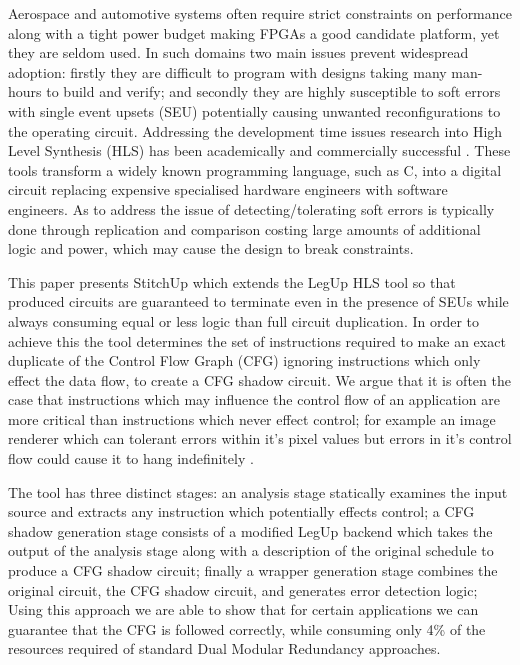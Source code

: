 
Aerospace and automotive systems often require strict constraints on performance
along with a tight power budget making FPGAs a good candidate platform, yet they are seldom used.
In such domains two main issues prevent widespread adoption: firstly they are difficult
to program with designs taking many man-hours to build and verify;
and secondly they are highly susceptible to soft errors with single event upsets (SEU)
potentially causing unwanted reconfigurations to the operating circuit.
Addressing the development time issues research into High Level Synthesis (HLS) has been academically and
commercially successful \cite{feist2012vivado}. These tools transform a widely known programming language, such as C,
into a digital circuit replacing expensive specialised hardware engineers with software engineers.
As to address the issue of detecting/tolerating soft errors is typically done through replication and comparison
costing large amounts of additional logic and power, which may cause the design to break constraints.

This paper presents StitchUp which extends the LegUp HLS tool \cite{canis2011legup} so that produced circuits are
guaranteed to terminate even in the presence of SEUs while always consuming equal or less logic than full circuit duplication.
In order to achieve this the tool determines the set of instructions required to make an exact duplicate of the Control
Flow Graph (CFG) ignoring instructions which only effect the data flow, to create a CFG shadow circuit.
We argue that it is often the case that instructions which may influence the control flow of an application are more critical
than instructions which never effect control; for example an image renderer which can tolerant errors within
it's pixel values but errors in it's control flow could cause it to hang indefinitely \cite{sampson2011enerj}.

The tool has three distinct stages: an analysis stage statically examines the input source and extracts any instruction
which potentially effects control; a CFG shadow generation stage consists of a modified LegUp backend
which takes the output of the analysis stage along with a description of the original schedule to produce a CFG shadow circuit;
finally a wrapper generation stage combines the original circuit, the CFG shadow circuit, and generates error detection logic;
Using this approach we are able to show that for certain applications we can guarantee that the CFG
is followed correctly, while consuming only 4\% of the resources required of standard Dual Modular Redundancy approaches.

